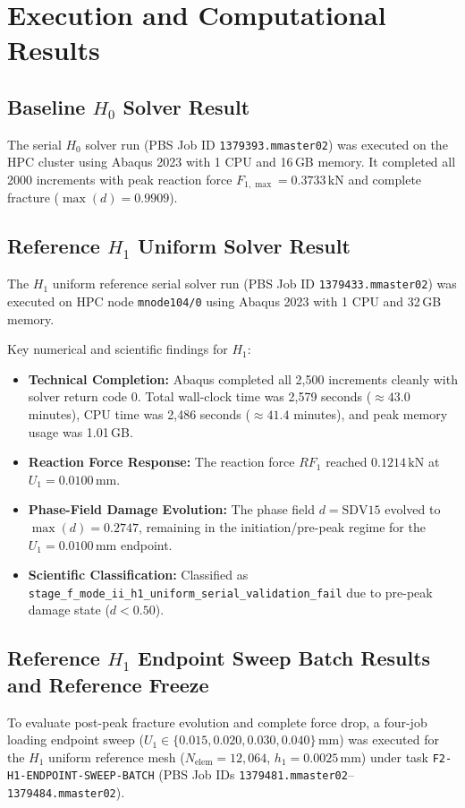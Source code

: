 \section{Execution and Computational Results}
\subsection{Baseline $H_0$ Solver Result}
The serial $H_0$ solver run (PBS Job ID \texttt{1379393.mmaster02}) was executed on the HPC cluster using Abaqus 2023 with 1 CPU and 16\,GB memory. It completed all 2000 increments with peak reaction force $F_{1,\max} = 0.3733\,\text{kN}$ and complete fracture ($\max(d) = 0.9909$).

\subsection{Reference $H_1$ Uniform Solver Result}
The $H_1$ uniform reference serial solver run (PBS Job ID \texttt{1379433.mmaster02}) was executed on HPC node \texttt{mnode104/0} using Abaqus 2023 with 1 CPU and 32\,GB memory.

Key numerical and scientific findings for $H_1$:
\begin{itemize}
    \item \textbf{Technical Completion:} Abaqus completed all 2,500 increments cleanly with solver return code 0. Total wall-clock time was 2,579 seconds ($\approx 43.0$ minutes), CPU time was 2,486 seconds ($\approx 41.4$ minutes), and peak memory usage was 1.01\,GB.
    \item \textbf{Reaction Force Response:} The reaction force $RF_1$ reached $0.1214\,\text{kN}$ at $U_1 = 0.0100\,\text{mm}$.
    \item \textbf{Phase-Field Damage Evolution:} The phase field $d = \text{SDV15}$ evolved to $\max(d) = 0.2747$, remaining in the initiation/pre-peak regime for the $U_1 = 0.0100\,\text{mm}$ endpoint.
    \item \textbf{Scientific Classification:} Classified as \texttt{stage\_f\_mode\_ii\_h1\_uniform\_serial\_validation\_fail} due to pre-peak damage state ($d < 0.50$).
\end{itemize}

\subsection{Reference $H_1$ Endpoint Sweep Batch Results and Reference Freeze}
To evaluate post-peak fracture evolution and complete force drop, a four-job loading endpoint sweep ($U_1 \in \{0.015, 0.020, 0.030, 0.040\}\,\text{mm}$) was executed for the $H_1$ uniform reference mesh ($N_{\mathrm{elem}} = 12,064$, $h_1 = 0.0025\,\text{mm}$) under task \texttt{F2-H1-ENDPOINT-SWEEP-BATCH} (PBS Job IDs \texttt{1379481.mmaster02}--\texttt{1379484.mmaster02}).

